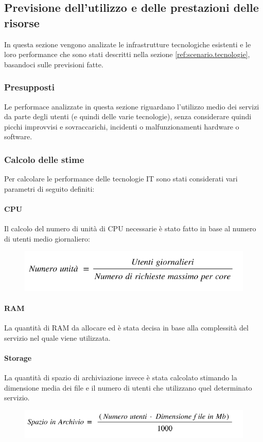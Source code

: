 \newpage
\subsection{Previsione dell'utilizzo e delle prestazioni delle risorse}
In questa sezione vengono analizate le infrastrutture tecnologiche esistenti e le loro performance che sono stati descritti nella sezione \ref{ref:scenario.tecnologie}, basandoci sulle previsioni fatte. \\
	\subsubsection{Presupposti}
	Le performace analizzate in questa sezione riguardano l'utilizzo medio dei servizi da parte degli utenti (e quindi delle varie tecnologie), senza considerare quindi picchi improvvisi e sovraccarichi, incidenti o malfunzionamenti hardware o software.
	
\subsubsection{Calcolo delle stime}
Per calcolare le performance delle tecnologie IT sono stati considerati vari parametri di seguito definiti:
\paragraph{CPU}
Il calcolo del numero di unità di CPU necessarie è stato fatto in base al numero di utenti medio giornaliero:\\
\begin{figure}[h!]
	\centering
	\includegraphics[width=0.5\linewidth]{./img/cpu}
\end{figure}

\paragraph{RAM}
La quantità di RAM da allocare ed è stata
decisa in base alla complessità del servizio nel quale viene utilizzata.

\paragraph{Storage}
La quantità di spazio di archiviazione invece è stata calcolato stimando la dimensione media dei file e il numero di utenti che utilizzano quel determinato servizio. \\
\begin{figure}[h!]
	\centering
	\includegraphics[width=0.5\linewidth]{./img/archivio}
\end{figure}

